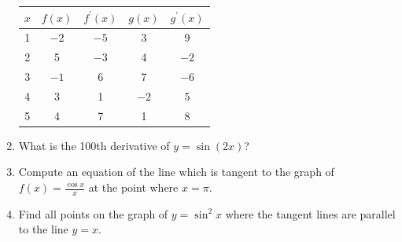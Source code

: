 \documentclass[12pt]{article}
\newif\ifans
\begin{document}
\begin{enumerate}
\begin{center}
\begin{tabular}{c|c|c|c|c}
$x$ & $f(x)$ & $f^{\prime}(x)$ & $g(x)$ & $g^{\prime}(x)$\\
\hline
1 & $-2$ & $-5$ & 3 & 9\\
2& 5 & $-3$ & 4 & $-2$\\
3 & $-1$ & 6  & 7 & $-6$\\
4 & 3 & 1 & $-2$ & 5\\
5 & 4 & 7 & 1 & 8
\end{tabular}
\end{center}

\ifans{\fbox{$-\frac{9\pi}{4}$}} \fi

\item What is the 100th derivative of $y=\sin{(2x)}$?

\ifans{\fbox{$2^{100}\sin{2x}$}} \fi

\item Compute an equation of the line which is tangent to the graph of $f(x)=\frac{\cos{x}}{x}$ at the point where $x=\pi$.

\ifans{\fbox{$y=\frac{1}{\pi^2}x-\frac{2}{\pi}$}} \fi

\item Find all points on the graph of $y=\sin^2{x}$ where the tangent lines are parallel to the line $y=x$.

\ifans{\fbox{$\frac{\pi}{4}+\pi k$ where $k$ is any integer}} \fi

\end{enumerate}

\end{document}
